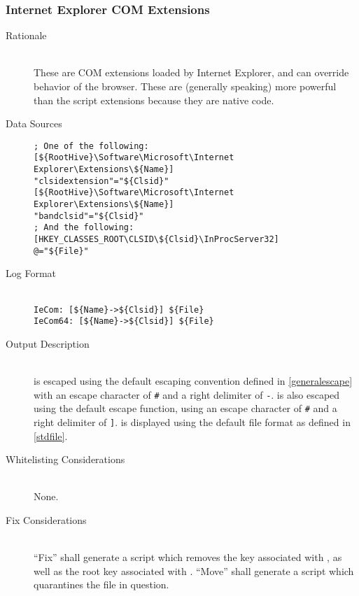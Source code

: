 \subsubsection{Internet Explorer COM Extensions}
\begin{description}
\item[Rationale] \hfill \\
These are COM extensions loaded by Internet Explorer, and can override
behavior of the browser. These are (generally speaking) more powerful than the
script extensions because they are native code.
\item[Data Sources] \hfill
\begin{verbatim}
; One of the following:
[${RootHive}\Software\Microsoft\Internet Explorer\Extensions\${Name}]
"clsidextension"="${Clsid}"
[${RootHive}\Software\Microsoft\Internet Explorer\Extensions\${Name}]
"bandclsid"="${Clsid}"
; And the following:
[HKEY_CLASSES_ROOT\CLSID\${Clsid}\InProcServer32]
@="${File}"
\end{verbatim}
\item[Log Format] \hfill \\
\verb|IeCom: [${Name}->${Clsid}] ${File}| \\
\verb|IeCom64: [${Name}->${Clsid}] ${File}|
\item[Output Description] \hfill \\
 is escaped using the default escaping convention defined in
\ref{generalescape} with an escape character of \verb|#| and a right delimiter
of \verb|-|.  is also escaped using the default escape function,
using an escape character of \verb|#| and a right delimiter of \verb|]|.
 is displayed using the default file format as defined in
\ref{stdfile}.
\item[Whitelisting Considerations] \hfill \\
None.
\item[Fix Considerations] \hfill \\
``Fix'' shall generate a script which removes the key associated with
, as well as the root key associated with .
``Move'' shall generate a script which quarantines the file in question.
\end{description}

